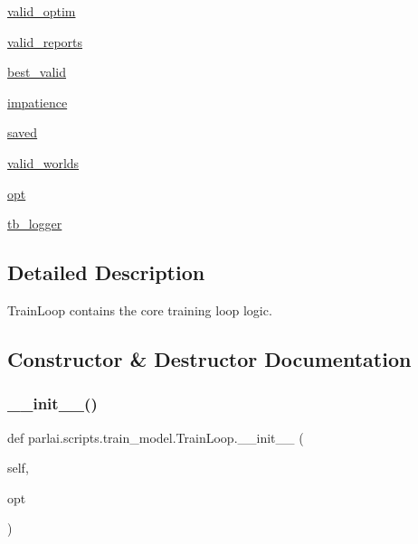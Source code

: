 \begin{DoxyCompactItemize}
\hyperlink{classparlai_1_1scripts_1_1train__model_1_1TrainLoop_abe8e421aafd3a42103c794f3e3a1bcc6}{valid\+\_\+optim}
\item 
\hyperlink{classparlai_1_1scripts_1_1train__model_1_1TrainLoop_abceaa403716b5def408e2fedca6c651d}{valid\+\_\+reports}
\item 
\hyperlink{classparlai_1_1scripts_1_1train__model_1_1TrainLoop_a48a44b00d7b814ff20d0599803e92411}{best\+\_\+valid}
\item 
\hyperlink{classparlai_1_1scripts_1_1train__model_1_1TrainLoop_aeb16930507dc585a10096e2b235e2745}{impatience}
\item 
\hyperlink{classparlai_1_1scripts_1_1train__model_1_1TrainLoop_a22cd642f6665fabdc49cdd294e257643}{saved}
\item 
\hyperlink{classparlai_1_1scripts_1_1train__model_1_1TrainLoop_a45643d393057a2a47e8a6e74acdc7515}{valid\+\_\+worlds}
\item 
\hyperlink{classparlai_1_1scripts_1_1train__model_1_1TrainLoop_a3f9cd4c0c08f457b3ecfd1e494ccf58c}{opt}
\item 
\hyperlink{classparlai_1_1scripts_1_1train__model_1_1TrainLoop_af6636a1279a3fb33f57ba1af500d049b}{tb\+\_\+logger}
\end{DoxyCompactItemize}


\subsection{Detailed Description}
\begin{DoxyVerb}TrainLoop contains the core training loop logic.
\end{DoxyVerb}
 

\subsection{Constructor \& Destructor Documentation}
\mbox{\label{classparlai_1_1scripts_1_1train__model_1_1TrainLoop_a87a9194a461efe30e8b4de6cd4036699}} 
\subsubsection{\texorpdfstring{\+\_\+\+\_\+init\+\_\+\+\_\+()}{\_\_init\_\_()}}
{\footnotesize\ttfamily def parlai.\+scripts.\+train\+\_\+model.\+Train\+Loop.\+\_\+\+\_\+init\+\_\+\+\_\+ (\begin{DoxyParamCaption}\item[{}]{self,  }\item[{}]{opt }\end{DoxyParamCaption})}



